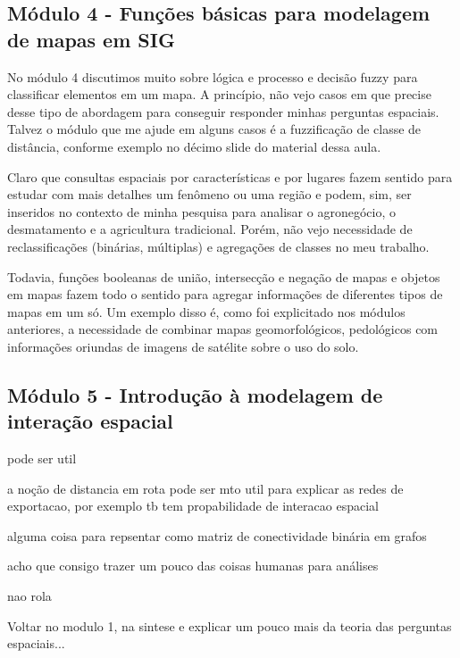 


\subsection{Módulo 4 - Funções básicas para modelagem de mapas em SIG}

No módulo 4 discutimos muito sobre lógica e processo e decisão fuzzy para classificar elementos em um mapa. A princípio, não vejo casos em que precise desse tipo de abordagem para conseguir responder minhas perguntas espaciais. Talvez o módulo que me ajude em alguns casos é a fuzzificação de classe de distância, conforme exemplo no décimo slide do material dessa aula.

Claro que consultas espaciais por características e por lugares fazem sentido para estudar com mais detalhes um fenômeno ou uma região e podem, sim, ser inseridos no contexto de minha pesquisa para analisar o agronegócio, o desmatamento e a agricultura tradicional. Porém, não vejo necessidade de reclassificações (binárias, múltiplas) e agregações de classes no meu trabalho.

Todavia, funções booleanas de união, intersecção e negação de mapas e objetos em mapas fazem todo o sentido para agregar informações de diferentes tipos de mapas em um só. Um exemplo disso é, como foi explicitado nos módulos anteriores, a necessidade de combinar mapas geomorfológicos, pedológicos com informações oriundas de imagens de satélite sobre o uso do solo.

\subsection{Módulo 5 - Introdução à modelagem de interação espacial}

pode ser util

a noção de distancia em rota pode ser mto util para explicar as redes de exportacao, por exemplo
tb tem propabilidade de interacao espacial

alguma coisa para repsentar como matriz de conectividade binária em grafos

acho que consigo trazer um pouco das coisas humanas para análises

nao rola


Voltar no modulo 1, na sintese e explicar um pouco mais da teoria das perguntas espaciais...
